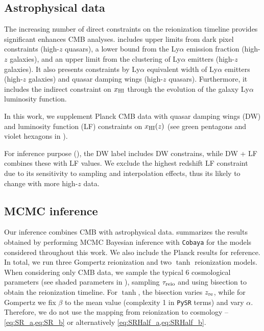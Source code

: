 \subsection*{Astrophysical data}
\label{ssec:xHI}
The increasing number of direct constraints on the reionization timeline
provides significant enhances CMB analyses.
 includes upper limits from dark pixel constraints\cite{Jin2023} 
(high-$z$ quasars), a lower bound from the Ly$\alpha$ emission 
fraction\cite{Mesinger2015} (high-$z$ galaxies), and an upper limit from the
clustering of Ly$\alpha$ emitters\cite{Sobacchi2015} (high-$z$ galaxies). 
It also presents constraints by Ly$\alpha$ equivalent width of Ly$\alpha$ 
emitters\cite{Mason2018, Mason2018,  Hoag2019} (high-$z$ galaxies) and 
quasar damping wings\cite{Greig2022, Greig2024, Spina2024, Durovcikova2024} 
(high-$z$ quasars). Furthermore, it includes the indirect constraint on $x_{\mathrm{HI}}$ 
through the evolution of the galaxy Ly$\alpha$ luminosity function\cite{Morales2021}.

In this work, we supplement Planck CMB data with quasar damping wings (DW) 
and luminosity function (LF) constraints on $x_{\mathrm{HI}} (z)$ (see green pentagons
and violet hexagons in ).

For  inference purpose (), the DW label includes DW constrains, 
while DW + LF combines these with LF values. We exclude the highest redshift
LF constraint due to its sensitivity to sampling and interpolation effects, thus its 
likely to change with more high-$z$ data. 


\subsection*{MCMC inference}
\label{ssec:fits}
Our inference combines CMB with astrophysical data.  
summarizes the results obtained by performing MCMC
Bayesian inference with \texttt{Cobaya} for the models considered
throughout this work.
We also include the Planck results \cite{Planck2020a} for reference.
In total, we run three Gompertz reionization and two $\tanh$
reionization models. When considering only CMB data, we sample
the typical 6 cosmological parameters (see shaded parameters in 
), sampling $\tau_{\mathrm{reio}}$ and using bisection to obtain
the reionization timeline. For $\tanh$, the bisection varies $z_{\mathrm{re}}$, 
while for Gompertz we fix $\beta$ to the mean value (complexity 1 
in \texttt{PySR} terms) and vary $\alpha$.  
Therefore, we do not use the mapping from reionization to cosmology --
\cref{eq:SR_a,eq:SR_b} or alternatively \cref{eq:SRHalf_a,eq:SRHalf_b}. 

